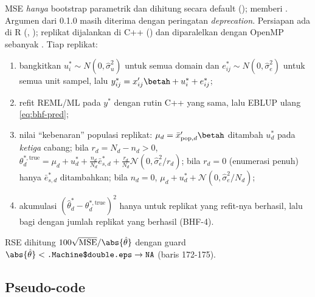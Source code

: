 MSE \emph{hanya} bootstrap parametrik \citep{gonzalez2008bootstrap} dan
dihitung secara default (); 
memberi . Argumen  dari 0.1.0 masih
diterima dengan peringatan \emph{deprecation}. Persiapan ada di R (,
); replikat dijalankan di C++
() dan diparalelkan dengan OpenMP sebanyak
. Tiap replikat:
\begin{enumerate}[label=\arabic*.]
  \item bangkitkan $u_i^\ast\sim N(0,\hat\sigma_u^2)$ untuk semua domain dan
        $e_{ij}^\ast\sim N(0,\hat\sigma_e^2)$ untuk semua unit sampel, lalu
        $y_{ij}^\ast=x_{ij}'\betah+u_{i}^\ast+e_{ij}^\ast$;
  \item refit REML/ML pada $y^\ast$ dengan rutin C++ yang sama, lalu
        EBLUP ulang \eqref{eq:bhf-pred};
  \item nilai ``kebenaran'' populasi replikat:
        $\mu_d=\bar x_{\text{pop},d}'\betah$ ditambah $u^\ast_d$ pada
        \emph{ketiga} cabang; bila $r_d=N_d-n_d>0$,
        $\theta^{\ast,\text{true}}_d=\mu_d+u^\ast_d+\tfrac{n_d}{N_d}\bar e^\ast_{s,d}
        +\tfrac{r_d}{N_d}\mathcal N(0,\hat\sigma_e^2/r_d)$;
        bila $r_d=0$ (enumerasi penuh) hanya $\bar e^\ast_{s,d}$ ditambahkan;
        bila $n_d=0$, $\mu_d+u^\ast_d+\mathcal N(0,\hat\sigma_e^2/N_d)$;
  \item akumulasi $(\hat\theta_d^\ast-\theta_d^{\ast,\text{true}})^2$ hanya
        untuk replikat yang refit-nya berhasil, lalu bagi dengan jumlah
        replikat yang berhasil (BHF-4).
\end{enumerate}

RSE dihitung $100\sqrt{\mathrm{MSE}}/\abs{\hat\theta}$ dengan guard
$\abs{\hat\theta}<\texttt{.Machine\$double.eps}\to\texttt{NA}$
(baris 172-175).

\subsection{Pseudo-code}\label{sec:bhf-algo}

